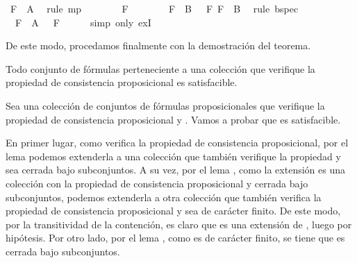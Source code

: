 \begin{isabellebody}
\ {\isacartoucheopen}F\ {\isasymin}\ A{\isacartoucheclose}\ \isamarkupfalse%
\ {\isacharparenleft}rule\ mp{\isacharparenright}\isanewline
\ \ \ \ \isamarkupfalse%
\ {\isachardoublequoteopen}{\isasymA}\ {\isasymTurnstile}\ F{\isachardoublequoteclose}\isanewline
\ \ \ \ \ \ \isamarkupfalse%
\ {\isacartoucheopen}{\isasymforall}F\ {\isasymin}\ B{\isachardot}\ {\isasymA}\ {\isasymTurnstile}\ F{\isacartoucheclose}\ {\isacartoucheopen}F\ {\isasymin}\ B{\isacartoucheclose}\ \isamarkupfalse%
\ {\isacharparenleft}rule\ bspec{\isacharparenright}\isanewline
\ \ \isamarkupfalse%
\isanewline
\ \ \isamarkupfalse%
\ {\isachardoublequoteopen}{\isasymexists}{\isasymA}{\isachardot}\ {\isasymforall}F\ {\isasymin}\ A{\isachardot}\ {\isasymA}\ {\isasymTurnstile}\ F{\isachardoublequoteclose}\isanewline
\ \ \ \ \isamarkupfalse%
\ {\isacharparenleft}simp\ only{\isacharcolon}\ exI{\isacharparenright}\isanewline
{}\isamarkupfalse%
%
\endisatagproof
{\isafoldproof}%
%
\isadelimproof
%
\endisadelimproof
%
\begin{isamarkuptext}%
De este modo, procedamos finalmente con la demostración del teorema.

  \begin{teorema}
    Todo conjunto de fórmulas perteneciente a una colección que verifique la propiedad de
    consistencia proposicional es satisfacible. 
  \end{teorema}

  \begin{demostracion}
    Sea  una colección de conjuntos de fórmulas proposicionales que verifique la propiedad de 
    consistencia proposicional y . Vamos a probar que  es satisfacible.

    En primer lugar, como  verifica la propiedad de consistencia proposicional, por el lema 
     podemos extenderla a una colección  que también verifique la propiedad y
    sea cerrada bajo subconjuntos. A su vez, por el lema , como la extensión 
     es una colección con la propiedad de consistencia proposicional y cerrada bajo 
    subconjuntos, podemos extenderla a otra colección  que también verifica la propiedad de
    consistencia proposicional y sea de carácter finito. De este modo, por la transitividad de la 
    contención, es claro que  es una extensión de , luego  por hipótesis. 
    Por otro lado, por el lema , como  es de carácter finito, se tiene que es 
    cerrada bajo subconjuntos. 


\end{demostracion}
\end{isamarkuptext}
\end{isabellebody}

